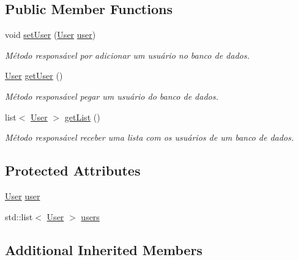 \subsection*{Public Member Functions}
\begin{DoxyCompactItemize}
\item 
void \hyperlink{class_user_command_a9a9763f3b2b3b268a1b7c7ab7c5b8f19}{set\-User} (\hyperlink{class_user}{User} \hyperlink{class_user_command_a70c92f418986d19c46252d6cf5b77704}{user})
\begin{DoxyCompactList}\small\item\em Método responsável por adicionar um usuário no banco de dados. \end{DoxyCompactList}\item 
\hypertarget{class_user_command_a6dac24afd2867d55993765135c459fff}{\hyperlink{class_user}{User} \hyperlink{class_user_command_a6dac24afd2867d55993765135c459fff}{get\-User} ()}\label{class_user_command_a6dac24afd2867d55993765135c459fff}

\begin{DoxyCompactList}\small\item\em Método responsável pegar um usuário do banco de dados. \end{DoxyCompactList}\item 
\hypertarget{class_user_command_a825103f7f6bc1d4fcf205f91926de104}{list$<$ \hyperlink{class_user}{User} $>$ \hyperlink{class_user_command_a825103f7f6bc1d4fcf205f91926de104}{get\-List} ()}\label{class_user_command_a825103f7f6bc1d4fcf205f91926de104}

\begin{DoxyCompactList}\small\item\em Método responsável receber uma lista com os usuários de um banco de dados. \end{DoxyCompactList}\end{DoxyCompactItemize}
\subsection*{Protected Attributes}
\begin{DoxyCompactItemize}
\item 
\hyperlink{class_user}{User} \hyperlink{class_user_command_a70c92f418986d19c46252d6cf5b77704}{user}
\item 
std\-::list$<$ \hyperlink{class_user}{User} $>$ \hyperlink{class_user_command_ab0d1d3e37f63ce84d46ac7540236765f}{users}
\end{DoxyCompactItemize}
\subsection*{Additional Inherited Members}


